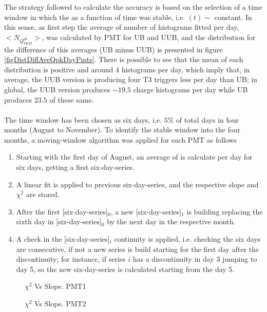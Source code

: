 \documentclass[twoside, final, 10pt]{articleMine}
\begin{document}
The strategy followed to calculate the \qpkvem accuracy is based
on the selection of a time window in which the \qpkvem as a
function of time was stable, i.e. \qpkvem$(t)\sim$ constant. In
this sense, as first step the average of number of histograms
fitted per day, $<N_{Q^{pk}_{VEM}}>$, was calculated by PMT for
UB and UUB, and the distribution for the difference of this
averages (UB minus UUB) is presented in figure
\ref{figDistDiffAveQpkDayPmts}. There is possible to see that the
mean of each distribution is positive and around 4 histograms per 
day, which imply that, in average, the UUB version is producing
four T3 triggers less per day than UB; in global, the UUB version
produces $\sim19.5$ charge histograms per day while UB produces
$23.5$ of these same.\\\\The time window has been chosen as six
days, i.e. $5\%$ of total days in four months (August to
November). To identify the stable window into the four months, a
moving-window algorithm was applied for each PMT as follows
\begin{enumerate}
  \item Starting with the first day of August, an average of
    \qpkvem is calculate per day for six days, getting a first
    six-day-series.
  \item A linear fit is applied to previous six-day-series, and
    the respective slope and $\chi^2$ are stored.
  \item After the first [six-day-series]$_0$, a new
    [six-day-series]$_1$ is building replacing the sixth day in
    [six-day-series]$_0$ by the next day in the respective month.
  \item A check in the [six-day-series]$_i$ continuity is
    applied, i.e. checking the six days are consecutive, if not a
    new series is build starting for the first day after the
    discontinuity; for instance, if series $i$ has a
    discontinuity in day 3 jumping to day 5, so the new
    six-day-series is calculated starting from the day 5.
\end{enumerate}
\newpage

\begin{figure}[!t]
  \centering
  \caption{$\chi^2$ Vs Slope. PMT1}
  \label{figChi2VsSlopPmt1}
\end{figure}

\begin{figure}[!t]
  \centering
  \caption{$\chi^2$ Vs Slope. PMT2}
  \label{figChi2VsSlopPmt2}
\end{figure}
\end{document}

